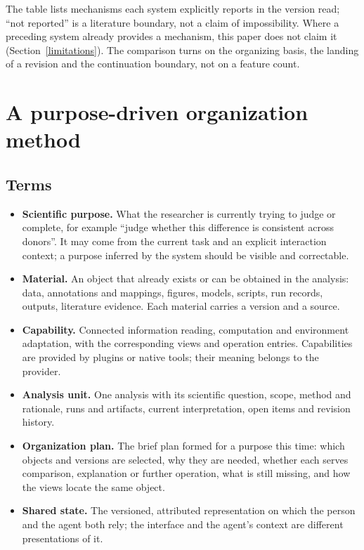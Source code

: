 \documentclass[11pt]{article}
\begin{document}
The table lists mechanisms each system explicitly reports in the version read; ``not reported'' is a literature boundary, not a claim of impossibility. Where a preceding system already provides a mechanism, this paper does not claim it (Section~\ref{limitations}). The comparison turns on the organizing basis, the landing of a revision and the continuation boundary, not on a feature count.

\section{A purpose-driven organization method}\label{method}

\subsection{Terms}\label{terms}

\begin{itemize}
  \item \textbf{Scientific purpose.} What the researcher is currently trying to judge or complete, for example ``judge whether this difference is consistent across donors''. It may come from the current task and an explicit interaction context; a purpose inferred by the system should be visible and correctable.
  \item \textbf{Material.} An object that already exists or can be obtained in the analysis: data, annotations and mappings, figures, models, scripts, run records, outputs, literature evidence. Each material carries a version and a source.
  \item \textbf{Capability.} Connected information reading, computation and environment adaptation, with the corresponding views and operation entries. Capabilities are provided by plugins or native tools; their meaning belongs to the provider.
  \item \textbf{Analysis unit.} One analysis with its scientific question, scope, method and rationale, runs and artifacts, current interpretation, open items and revision history.
  \item \textbf{Organization plan.} The brief plan formed for a purpose this time: which objects and versions are selected, why they are needed, whether each serves comparison, explanation or further operation, what is still missing, and how the views locate the same object.
  \item \textbf{Shared state.} The versioned, attributed representation on which the person and the agent both rely; the interface and the agent's context are different presentations of it.
\end{itemize}
\end{document}
